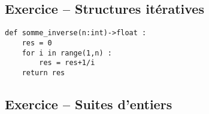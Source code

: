 %
%
%
%



\subsection*{Exercice -- Structures itératives}

\ifprof
\begin{corrige}
\begin{lstlisting}
def somme_inverse(n:int)->float :
    res = 0
    for i in range(1,n) : 
        res = res+1/i
    return res
\end{lstlisting}
\end{corrige}
\else
\fi


%
%



\subsection*{Exercice -- Suites d'entiers}

